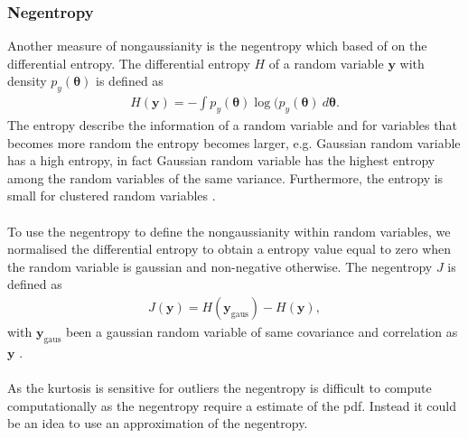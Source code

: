 \subsubsection{Negentropy}
Another measure of nongaussianity is the negentropy which based of on the differential entropy. The differential entropy $H$ of a random variable $\mathbf{y}$ with density $p_y (\boldsymbol{\theta})$ is defined as
\begin{align*}
H(\mathbf{y}) = - \int p_y (\boldsymbol{\theta}) \log (p_y (\boldsymbol{\theta}) \ d\boldsymbol{\theta}.
\end{align*}
The entropy describe the information of a random variable and for variables that becomes more random the entropy becomes larger, e.g. Gaussian random variable has a high entropy, in fact Gaussian random variable has the highest entropy among the random variables of the same variance. Furthermore, the entropy is small for clustered random variables \cite[p. 182]{ICA}.
\\ \\
To use the negentropy to define the nongaussianity within random variables, we normalised the differential entropy to obtain a entropy value equal to zero when the random variable is gaussian and non-negative otherwise. The negentropy $J$ is defined as 
\begin{align*}
J(\mathbf{y}) = H(\mathbf{y}_{\text{gaus}}) - H(\mathbf{y}),
\end{align*}
with $\mathbf{y}_{\text{gaus}}$ been a gaussian random variable of same covariance and correlation as $\mathbf{y}$ \cite[p. 182]{ICA}.
\\ \\
As the kurtosis is sensitive for outliers the negentropy is difficult to compute computationally as the negentropy require a estimate of the pdf. Instead it could be an idea to use an approximation of the negentropy.
 
